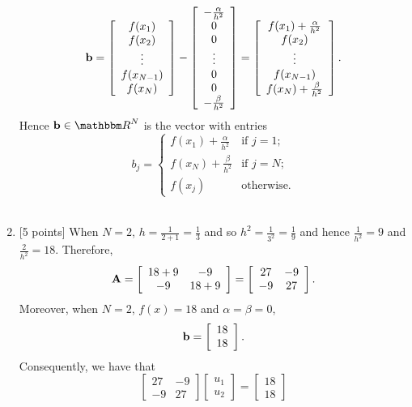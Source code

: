 \begin{solution}
\begin{enumerate}
\[{\bf b}=\left[\begin{array}{c} f(x_1) \\ f(x_2) \\ \vdots \\ f(x_{N-1}) \\ f(x_N) \end{array}\right]-\left[\begin{array}{c} -\frac{\alpha}{h^2} \\ 0 \\ 0 \\ \vdots \\ 0 \\ 0 \\ -\frac{\beta}{h^2} \end{array}\right]=\left[\begin{array}{c} f(x_1)+\frac{\alpha}{h^2} \\ f(x_2) \\ \vdots \\ f(x_{N-1}) \\ f(x_N)+\frac{\beta}{h^2} \end{array}\right].
\]
Hence $\Bb\in\R^N$ is the vector with entries
\[
b_j=\left\{\begin{array}{rl}
f(x_1)+\frac{\alpha}{h^2} & \mbox{if }j=1;
\\
f(x_N)+\frac{\beta}{h^2} & \mbox{if }j=N;
\\
f(x_j) & \mbox{otherwise}.
\end{array}\right.
\]
\\
\item {[5 points]} When $N=2$, $h=\frac{1}{2+1}=\frac{1}{3}$ and so $h^2=\frac{1}{3^2}=\frac{1}{9}$ and hence $\frac{1}{h^2}=9$ and $\frac{2}{h^2}=18$. Therefore,
\[
{\bf A}=\left[\begin{array}{cc}  18+9 & -9 \\ -9 & 18+9 \end{array}\right]=\left[\begin{array}{cc}  27 & -9 \\ -9 & 27 \end{array}\right].
\]
Moreover, when $N=2$, $f(x)=18$ and $\alpha=\beta=0$,
\[
{\bf b}=\left[\begin{array}{c} 18 \\ 18 \end{array}\right].
\]
Consequently, we have that
\[
\left[\begin{array}{cc}  27 & -9 \\ -9 & 27 \end{array}\right]\left[\begin{array}{c} u_1 \\ u_2 \end{array}\right]=\left[\begin{array}{c} 18 \\ 18 \end{array}\right]
\]
\end{enumerate}
\end{solution}

